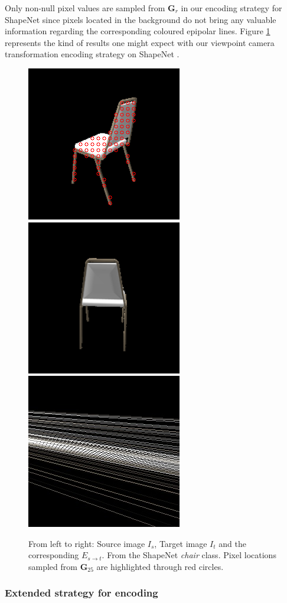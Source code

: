 Only non-null pixel values are sampled from $\textbf{G}_{r}$ in our encoding strategy for ShapeNet \citep{chang2015shapenet} since pixels located in the background do not bring any valuable information regarding the corresponding coloured epipolar lines. Figure \ref{fig:examplePoseEncoded} represents the kind of results one might expect with our viewpoint camera transformation encoding strategy on ShapeNet \citep{chang2015shapenet}. 
\begin{figure}[h!]

\begin{center}
\includegraphics[width=.26\textwidth]{images/epipolarnvs/Is_ECML.png}\hspace{.5cm}%
\includegraphics[width=.26\textwidth]{images/epipolarnvs/It_ECML.png}\hspace{.5cm}%
\includegraphics[width=.26\textwidth]{images/epipolarnvs/Est_ECML.jpg}
\end{center}
\caption{From left to right: Source image $I_s$, Target image $I_t$ and the corresponding $E_{s\xrightarrow{}t}$. From the ShapeNet \citep{chang2015shapenet} \textit{chair} class. Pixel locations sampled from $\textbf{G}_{25}$ are highlighted through red circles.}
\label{fig:examplePoseEncoded}
\end{figure}



\subsubsection{Extended strategy for encoding}

